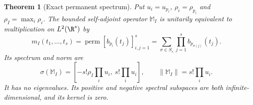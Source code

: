 \documentclass[11pt,a4paper]{article}
\newtheorem{theorem}{Theorem}[section]
\theoremstyle{definition}\newtheorem{definition}[theorem]{Definition}
\providecommand{\perm}{\operatorname{perm}}
\begin{document}
\begin{theorem}[Exact permanent spectrum]\label{fms:fms:spectrum}
Put $u_i=u_{p_i}$, $\rho_i=\rho_{p_i}$ and
$\rho_I=\max_i\rho_i$.  The bounded self-adjoint operator
$\mathbb M_I$ is unitarily equivalent to multiplication on
$L^2(\R^s)$ by
\begin{equation}\tag{FMS15}\label{fms:fms:permanent}
 m_I(t_1,\ldots,t_s)=
 \perm[b_{p_i}(t_j)]_{i,j=1}^s
 =\sum_{\sigma\in S_s}\prod_{j=1}^s b_{p_{\sigma(j)}}(t_j).
\end{equation}
Its spectrum and norm are
\begin{equation}\tag{FMS16}\label{fms:fms:spectralinterval}
 \sigma(\mathbb M_I)=
 [-s!\rho_I\prod_i u_i,\ s!\prod_i u_i],
 \qquad \|\mathbb M_I\|=s!\prod_i u_i.
\end{equation}
It has no eigenvalues. Its positive and negative spectral subspaces
are both infinite-dimensional, and its kernel is zero.
\end{theorem}
\end{document}
